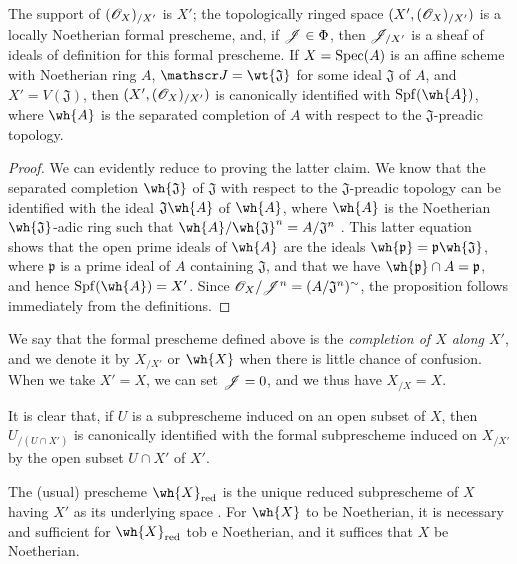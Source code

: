 \begin{proposition}[10.8.5]
\label{1.10.8.5}
The support of $(\mathscr{O}_X)_{/X'}$ is $X'$; the topologically ringed space $(X',(\mathscr{O}_X)_{/X'})$ is a locally Noetherian formal prescheme, and, if $\mathscr{J}\in\Phi$, then $\mathscr{J}_{/X'}$ is a sheaf of ideals of definition for this formal prescheme.
If $X=\operatorname{Spec}(A)$ is an affine scheme with Noetherian ring $A$, $\sh{J}=\wt{\mathfrak{J}}$ for some ideal $\mathfrak{J}$ of $A$, and $X'=V(\mathfrak{J})$, then $(X',(\mathscr{O}_X)_{/X'})$ is canonically identified with $\Spf(\wh{A})$, where $\wh{A}$ is the separated completion of $A$ with respect to the $\mathfrak{J}$-preadic topology.
\end{proposition}

\begin{proof}
\label{proof-1.10.8.5}
We can evidently reduce to proving the latter claim.
We know  that the separated completion $\wh{\mathfrak{J}}$ of $\mathfrak{J}$ with respect to the $\mathfrak{J}$-preadic topology can be identified with the ideal $\mathfrak{J}\wh{A}$ of $\wh{A}$, where $\wh{A}$ is the Noetherian $\wh{\mathfrak{J}}$-adic ring such that $\wh{A}/\wh{\mathfrak{J}}^n=A/\mathfrak{J}^n$ .
This latter equation shows that the open prime ideals of $\wh{A}$ are the ideals $\wh{\mathfrak{p}}=\mathfrak{p}\wh{\mathfrak{J}}$, where $\mathfrak{p}$ is a prime ideal of $A$ containing $\mathfrak{J}$, and that we have $\wh{\mathfrak{p}}\cap A=\mathfrak{p}$, and hence $\Spf(\wh{A})=X'$.
Since $\mathscr{O}_X/\mathscr{J}^n=(A/\mathfrak{J}^n)^\sim$, the proposition follows immediately from the definitions.
\end{proof}

We say that the formal prescheme defined above is the \emph{completion of $X$ along $X'$}, and we denote it by $X_{/X'}$ or $\wh{X}$ when there is little chance of confusion.
When we take $X'=X$, we can set $\mathscr{J}=0$, and we thus have $X_{/X}=X$.

It is clear that, if $U$ is a subprescheme induced on an open subset of $X$, then $U_{/(U\cap X')}$ is canonically identified with the formal subprescheme induced on $X_{/X'}$ by the open subset $U\cap X'$ of $X'$.

\begin{corollary}[10.8.6]
\label{1.10.8.6}
The (usual) prescheme $\wh{X}_\red$ is the unique reduced subprescheme of $X$ having $X'$ as its underlying space .
For $\wh{X}$ to be Noetherian, it is necessary and sufficient for $\wh{X}_\red$ tob e Noetherian, and it suffices that $X$ be Noetherian.
\end{corollary}

